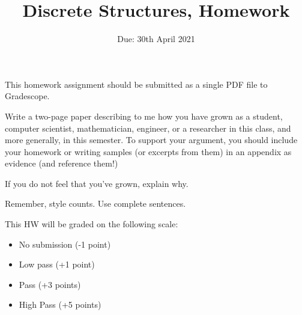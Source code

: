 \documentclass{article}
\title{Discrete Structures, Homework \hwnum}
\author{\todo{Put Your Name Here}}
\date{Due: 30th April 2021}
\begin{document}
\maketitle

This homework assignment should be
submitted as a single PDF file to Gradescope.

Write a two-page paper describing to me how you have grown as a student,
computer scientist, mathematician, engineer, or a researcher in this class, and
more generally, in this semester.  To support your argument, you should include
your homework or writing samples (or excerpts from them) in an appendix as
evidence (and reference them!)

If you do not feel that you've grown, explain why.

Remember, style counts. Use complete sentences.

This HW will be graded on the following scale:
\begin{itemize}
    \item No submission (-1 point)
    \item Low pass (+1 point)
    \item Pass (+3 points)
    \item High Pass (+5 points)
\end{itemize}
\end{document}
